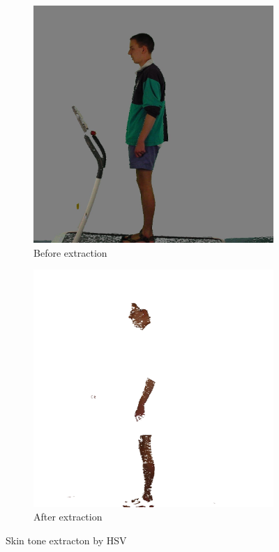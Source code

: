 \documentclass[10pt,journal,compsoc]{IEEEtran}
\begin{document}
\begin{figure}[!htb]
\begin{subfigure}[h]{0.45\linewidth}
    \includegraphics[width=\linewidth]{noGreen}
\caption{Before extraction}
\end{subfigure}
\hfill
\begin{subfigure}[h]{0.45\linewidth}
\includegraphics[width=\linewidth]{skin}
\caption{After extraction}
\end{subfigure}%
\caption{Skin tone extracton by HSV}
\end{figure}
\end{document}
